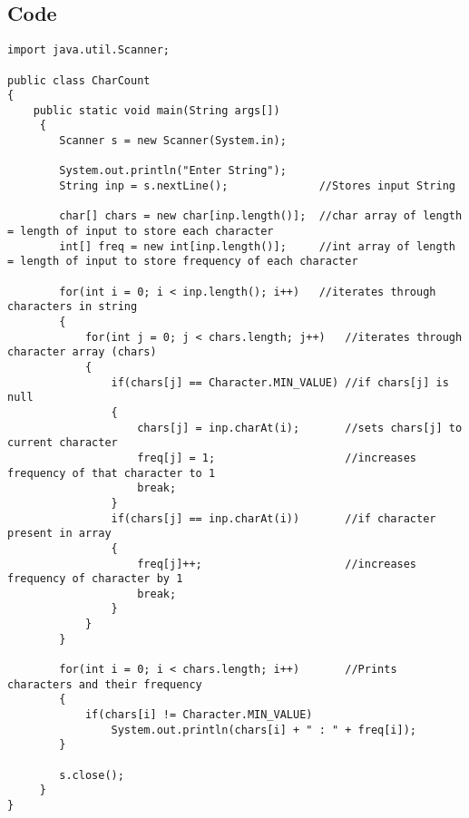 \documentclass[ProgramminAssignment.tex]{subfiles}
\begin{document}
\subsection{Code}
\begin{lstlisting}
import java.util.Scanner;

public class CharCount
{
	public static void main(String args[])
	 {
		Scanner s = new Scanner(System.in);
		
		System.out.println("Enter String");
		String inp = s.nextLine();				//Stores input String
		
		char[] chars = new char[inp.length()];	//char array of length = length of input to store each character
		int[] freq = new int[inp.length()];		//int array of length = length of input to store frequency of each character
		
		for(int i = 0; i < inp.length(); i++)	//iterates through characters in string
		{
			for(int j = 0; j < chars.length; j++)	//iterates through character array (chars)
			{
				if(chars[j] == Character.MIN_VALUE)	//if chars[j] is null
				{
					chars[j] = inp.charAt(i);		//sets chars[j] to current character
					freq[j] = 1;					//increases frequency of that character to 1
					break;
				}
				if(chars[j] == inp.charAt(i))		//if character present in array
				{
					freq[j]++;						//increases frequency of character by 1
					break;
				}
			}
		}
		
		for(int i = 0; i < chars.length; i++)		//Prints characters and their frequency
		{
			if(chars[i] != Character.MIN_VALUE)
				System.out.println(chars[i] + " : " + freq[i]);
		}
		
		s.close();
	 }
}

\end{lstlisting}
\end{document}
